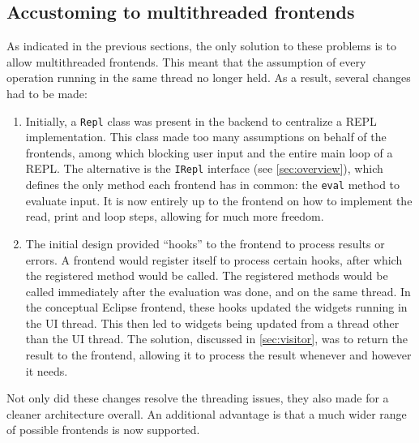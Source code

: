 \subsection{Accustoming to multithreaded frontends}

As indicated in the previous sections, the only solution to these problems is to
allow multithreaded frontends. This meant that the assumption of every
operation running in the same thread no longer held. As a result, several
changes had to be made:

\begin{enumerate}
  \item Initially, a \texttt{Repl} class was present in the backend to
  centralize a REPL implementation. This class made too many assumptions on
  behalf of the frontends, among which blocking user input and the entire main
  loop of a REPL. The alternative is the \texttt{IRepl} interface (see
  \cref{sec:overview}), which defines the only method each frontend has in
  common: the \texttt{eval} method to evaluate input. It is now entirely up to
  the frontend on how to implement the read, print and loop steps, allowing for
  much more freedom.
  \item	The initial design provided ``hooks'' to the frontend to process results or
  errors. A frontend would register itself to process certain hooks, after which
  the registered method would be called. The registered methods would be called
  immediately after the evaluation was done, and on the same thread. In the
  conceptual Eclipse frontend, these hooks updated the widgets running in the UI
  thread. This then led to widgets being updated from a thread other than the UI
  thread. The solution, discussed in \cref{sec:visitor}, was to return the
  result to the frontend, allowing it to process the result whenever and however
  it needs.
\end{enumerate}

Not only did these changes resolve the threading issues, they also made for a
cleaner architecture overall. An additional advantage is that a much wider range
of possible frontends is now supported.

